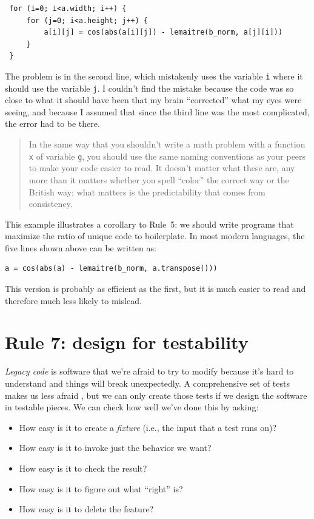 \documentclass[10pt,letterpaper]{article}
\begin{document}
\begin{verbatim}
 for (i=0; i<a.width; i++) {
     for (j=0; i<a.height; j++) {
         a[i][j] = cos(abs(a[i][j]) - lemaitre(b_norm, a[j][i]))
     }
 }
\end{verbatim}

The problem is in the second line,
which mistakenly uses the variable \texttt{i} where it should use the variable \texttt{j}.
I couldn't find the mistake because
the code was so close to what it should have been that my brain ``corrected'' what my eyes were seeing,
and because I assumed that since the third line was the most complicated,
the error had to be there.

\begin{quotation}
  In the same way that you shouldn't write a math problem with a function \texttt{x} of variable \texttt{g},
  you should use the same naming conventions as your peers
  to make your code easier to read.
  It doesn't matter what these are,
  any more than it matters whether you spell ``color'' the correct way or the British way;
  what matters is the predictability that comes from consistency.
\end{quotation}

This example illustrates a corollary to Rule~5:
we should write programs that maximize the ratio of unique code to boilerplate.
In most modern languages,
the five lines shown above can be written as:

\begin{verbatim}
a = cos(abs(a) - lemaitre(b_norm, a.transpose()))
\end{verbatim}

\noindent
This version is probably as efficient as the first,
but it is much easier to read and therefore much less likely to mislead.

\section*{Rule 7: design for testability}

\emph{Legacy code} is software that we're afraid to try to modify
because it's hard to understand and things will break unexpectedly.
A comprehensive set of tests makes us less afraid \cite{Feathers2004},
but we can only create those tests if we design the software in testable pieces.
We can check how well we've done this by asking:

\begin{itemize}
\item
  How easy is it to create a \emph{fixture}
  (i.e., the input that a test runs on)?
\item
  How easy is it to invoke just the behavior we want?
\item
  How easy is it to check the result?
\item
  How easy is it to figure out what ``right'' is?
\item
  How easy is it to delete the feature?
\end{itemize}
\end{document}
